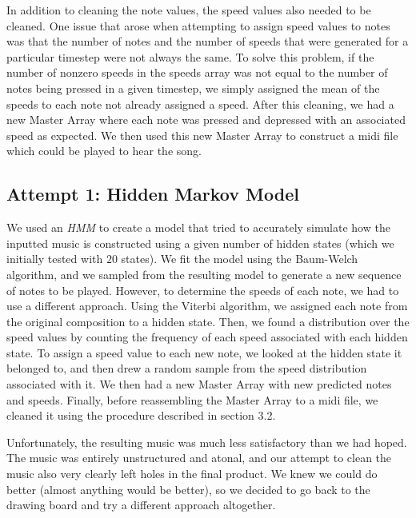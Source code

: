 \documentclass[11pt]{article}
\begin{document}
In addition to cleaning the note values, the speed values also needed to be cleaned. One issue that arose when attempting to assign speed values to notes was that the number of notes and the number of speeds that were generated for a particular timestep were not always the same. To solve this problem, if the number of nonzero speeds in the speeds array
was not equal to the number of notes being pressed in a given timestep, we
simply assigned the mean of the speeds to each note not already assigned a speed. After this cleaning, we had a new Master Array where each note was pressed and
depressed with an associated speed as expected. We then used this new
Master Array to construct a midi file which could be played to hear the song.

\subsection{Attempt 1: Hidden Markov Model}
We used an \textit{HMM} to create a model that tried to accurately simulate how
the inputted music is constructed using a given number of hidden states 
(which we initially tested with $20$ states). We fit the model using the Baum-Welch algorithm, and we sampled from the resulting model to generate a new sequence of notes to be played. However, to determine the speeds of each note, 
we had to use a different approach. Using the Viterbi algorithm, we assigned each note from the original composition to a hidden state. Then, we found a distribution over the speed values by counting the frequency of each speed associated with each hidden state. To assign a speed value to each new note, we looked at the hidden state it belonged to, and then drew a random sample from the speed distribution associated with it. We then had a new Master Array with new predicted notes and speeds. Finally, before reassembling the Master Array to a midi file, we cleaned it using the procedure described in section 3.2.


Unfortunately, the resulting music was much less satisfactory than we had
hoped. The music was entirely unstructured and atonal, and our attempt to
clean the music also very clearly left holes in the final product. We knew
we could do better (almost anything would be better), so we decided to go 
back to the drawing board and try a different approach altogether. 
\end{document}
